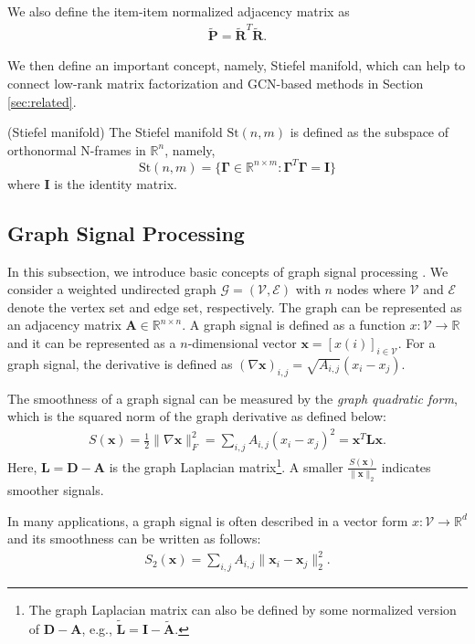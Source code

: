 \documentclass[sigconf]{acmart}
\begin{document}
We also define the item-item normalized adjacency matrix as 
\begin{align*}
    \tilde{\bm{P} } = \tilde{\bm{R}}^T\tilde{\bm{R}}.
\end{align*}

We then define an important concept, namely, Stiefel manifold, which can help to connect low-rank matrix factorization and GCN-based methods in Section \ref{sec:related}.


\begin{definition} (Stiefel manifold) The Stiefel manifold $\text{St}(n,m)$ is defined as the subspace of orthonormal N-frames in $\mathbb{R}^n$, namely,
\begin{equation}
\text{St}(n,m) = \{\bm{\Gamma} \in \mathbb{R}^{n\times m}: \bm{\Gamma}^T\bm{\Gamma} = \bm{I}  \}
\end{equation}
where $\bm{I}$ is the identity matrix.
\end{definition}
\subsection{Graph Signal Processing}
In this subsection, we introduce basic concepts of graph signal processing \cite{dong2020graph,ramakrishna2020user}. We consider a weighted undirected graph $\mathcal{G} = (\mathcal{V},\mathcal{E})$ with $n$ nodes where $\mathcal{V}$ and $\mathcal{E}$ denote the vertex set and edge set, respectively. The graph can be represented as an adjacency matrix $\bm{A} \in \mathbb{R}^{n \times n}$. A graph signal is defined as a function $x:\mathcal{V} \rightarrow \mathbb{R}$ and it can be represented as a $n$-dimensional vector $\bm{x} = [x(i)]_{i \in \mathcal{V}}$. For a graph signal, the derivative is defined as $(\nabla \bm{x})_{i,j} = \sqrt{A_{i,j} } (x_i - x_j)$.

The smoothness of a graph signal can be measured by the \emph{graph quadratic form}, which is the squared norm of the graph derivative as defined below:
\begin{align*}
    S(\bm{x}) = \frac{1}{2} \|\nabla \bm{x}\|_F^2 = \sum_{i,j} A_{i,j} (x_i - x_j)^2 = \bm{x}^T \bm{L} \bm{x}.
\end{align*}
Here, $\bm{L} = \bm{D} - \bm{A}$ is the graph Laplacian matrix\footnote{The graph Laplacian matrix can also be defined by some normalized version of $\bm{D} - \bm{A}$, e.g., $\tilde{\bm{L}} = \bm{I} - \tilde{\bm{A}}$.}. A smaller $\frac{S(\bm{x})}{\|\bm{x}\|_2}$ indicates smoother signals. 

In many applications, a graph signal is often described in a vector form $x: \mathcal{V} \rightarrow \mathbb{R}^d$ and its smoothness can be written as follows:
\begin{align} \label{eq:vec_smooth}
    S_2(\bm{x}) = \sum_{i,j} A_{i,j} \|\bm{x}_i - \bm{x}_j\|_2^2.
\end{align}
\end{document}
